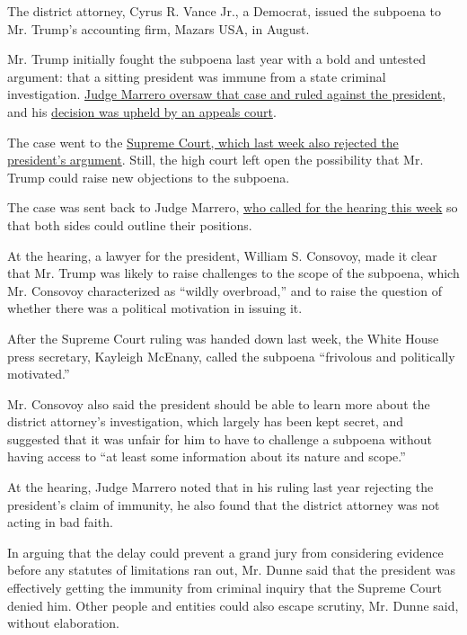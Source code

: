 The district attorney, Cyrus R. Vance Jr., a Democrat, issued the
subpoena to Mr. Trump's accounting firm, Mazars USA, in August.

Mr. Trump initially fought the subpoena last year with a bold and
untested argument: that a sitting president was immune from a state
criminal investigation.
\href{https://www.nytimes.com/2019/10/07/nyregion/trump-taxes-lawsuit-vance.html}{Judge
Marrero oversaw that case and ruled against the president}, and his
\href{https://www.nytimes.com/2019/11/04/nyregion/trump-taxes-vance-appeal.html}{decision
was upheld by an appeals court}.

The case went to the
\href{https://www.nytimes.com/2020/07/09/us/trump-taxes-supreme-court.html}{Supreme
Court, which last week also rejected the president's argument}. Still,
the high court left open the possibility that Mr. Trump could raise new
objections to the subpoena.

The case was sent back to Judge Marrero,
\href{https://www.nytimes.com/2020/07/15/nyregion/donald-trump-taxes-cyrus-vance.html}{who
called for the hearing this week} so that both sides could outline their
positions.

At the hearing, a lawyer for the president, William S. Consovoy, made it
clear that Mr. Trump was likely to raise challenges to the scope of the
subpoena, which Mr. Consovoy characterized as ``wildly overbroad,'' and
to raise the question of whether there was a political motivation in
issuing it.

After the Supreme Court ruling was handed down last week, the White
House press secretary, Kayleigh McEnany, called the subpoena ``frivolous
and politically motivated.''

Mr. Consovoy also said the president should be able to learn more about
the district attorney's investigation, which largely has been kept
secret, and suggested that it was unfair for him to have to challenge a
subpoena without having access to ``at least some information about its
nature and scope.''

At the hearing, Judge Marrero noted that in his ruling last year
rejecting the president's claim of immunity, he also found that the
district attorney was not acting in bad faith.

In arguing that the delay could prevent a grand jury from considering
evidence before any statutes of limitations ran out, Mr. Dunne said that
the president was effectively getting the immunity from criminal inquiry
that the Supreme Court denied him. Other people and entities could also
escape scrutiny, Mr. Dunne said, without elaboration.

